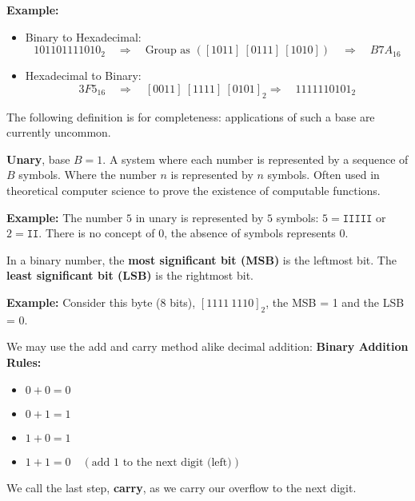 \noindent
\textbf{Example:}
    \begin{itemize}
        \item Binary to Hexadecimal:
        \[
        101101111010_2 \quad \Rightarrow \quad \text{Group as } ([1011] \ [0111] \ [1010]) \quad \Rightarrow \quad B7A_{16}
        \]
        \item Hexadecimal to Binary:
        \[
        3F5_{16} \quad \Rightarrow \quad [0011]\ [1111]\ [0101]_2 \Rightarrow \quad 1111110101_2
        \]
        \noindent
    \end{itemize}
    \noindent

\newpage 

The following definition is for completeness: applications of such a base are currently uncommon.
\begin{Def}[Unary]
    
    \textbf{Unary}, base $B=1$. A system where each number is represented by a sequence of $B$ symbols. Where the number $n$ is represented by $n$ symbols. Often used in theoretical computer science to prove the existence of computable functions.
\end{Def}
\noindent
\textbf{Example:} The number $5$ in unary is represented by $5$ symbols: $5 = \texttt{IIIII}$ or $2= \texttt{II}$. There is no concept of 0, the absence of symbols represents 0.\\
\begin{Def}
    
    In a binary number, the \textbf{most significant bit (MSB)} is the leftmost bit. The \textbf{least significant bit (LSB)} is the rightmost bit.
\end{Def}
\textbf{Example:} Consider this byte (8 bits), $[1111 \ 1110]_2$, the MSB = 1 and the LSB = 0.  

\begin{theo}

    We may use the add and carry method alike decimal addition:
    \textbf{Binary Addition Rules:}
    \begin{itemize}
        \item $0 + 0 = 0$
        \item $0 + 1 = 1$
        \item $1 + 0 = 1$
        \item $1 + 1 = 0 \quad (\text{add 1 to the next digit (left)})$
    \end{itemize}
    \noindent
    We call the last step, \textbf{carry}, as we carry our overflow to the next digit.
\end{theo}

